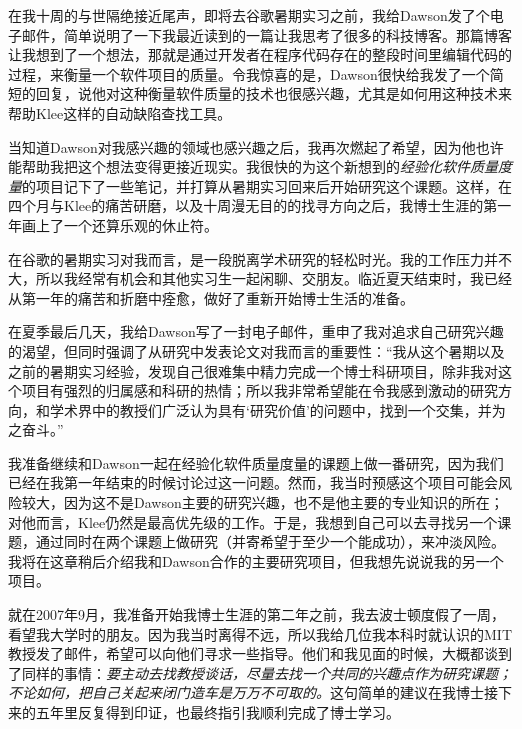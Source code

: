 \documentclass[letter,12pt]{book}
\begin{document}
\begin{CJK}{UTF8}{gbsn}
\breakline

在我十周的与世隔绝接近尾声，即将去谷歌暑期实习之前，我给Dawson发了个电子邮件，简单说明了一下我最近读到的一篇让我思考了很多的科技博客。那篇博客让我想到了一个想法，那就是通过开发者在程序代码存在的整段时间里编辑代码的过程，来衡量一个软件项目的质量。令我惊喜的是，Dawson很快给我发了一个简短的回复，说他对这种衡量软件质量的技术也很感兴趣，尤其是如何用这种技术来帮助Klee这样的自动缺陷查找工具。

当知道Dawson对我感兴趣的领域也感兴趣之后，我再次燃起了希望，因为他也许能帮助我把这个想法变得更接近现实。我很快的为这个新想到的\emph{经验化软件质量度量}的项目记下了一些笔记，并打算从暑期实习回来后开始研究这个课题。这样，在四个月与Klee的痛苦研磨，以及十周漫无目的的找寻方向之后，我博士生涯的第一年画上了一个还算乐观的休止符。


在谷歌的暑期实习对我而言，是一段脱离学术研究的轻松时光。我的工作压力并不大，所以我经常有机会和其他实习生一起闲聊、交朋友。临近夏天结束时，我已经从第一年的痛苦和折磨中痊愈，做好了重新开始博士生活的准备。

在夏季最后几天，我给Dawson写了一封电子邮件，重申了我对追求自己研究兴趣的渴望，但同时强调了从研究中发表论文对我而言的重要性：“我从这个暑期以及之前的暑期实习经验，发现自己很难集中精力完成一个博士科研项目，除非我对这个项目有强烈的归属感和科研的热情；所以我非常希望能在令我感到激动的研究方向，和学术界中的教授们广泛认为具有‘研究价值’的问题中，找到一个交集，并为之奋斗。”

我准备继续和Dawson一起在经验化软件质量度量的课题上做一番研究，因为我们已经在我第一年结束的时候讨论过这一问题。然而，我当时预感这个项目可能会风险较大，因为这不是Dawson主要的研究兴趣，也不是他主要的专业知识的所在；对他而言，Klee仍然是最高优先级的工作。于是，我想到自己可以去寻找另一个课题，通过同时在两个课题上做研究（并寄希望于至少一个能成功），来冲淡风险。我将在这章稍后介绍我和Dawson合作的主要研究项目，但我想先说说我的另一个项目。

\breakline

就在2007年9月，我准备开始我博士生涯的第二年之前，我去波士顿度假了一周，看望我大学时的朋友。因为我当时离得不远，所以我给几位我本科时就认识的MIT教授发了邮件，希望可以向他们寻求一些指导。他们和我见面的时候，大概都谈到了同样的事情：\emph{要主动去找教授谈话，尽量去找一个共同的兴趣点作为研究课题；不论如何，把自己关起来闭门造车是万万不可取的。}这句简单的建议在我博士接下来的五年里反复得到印证，也最终指引我顺利完成了博士学习。


\end{CJK}
\end{document}
